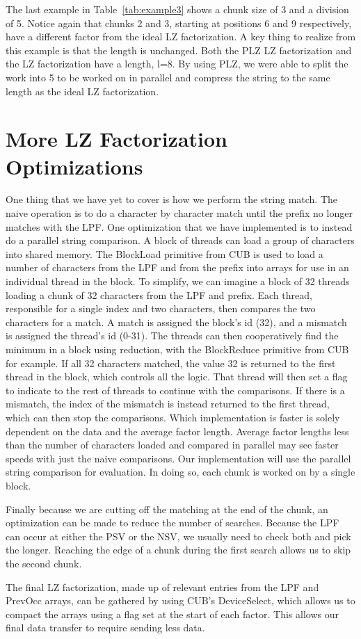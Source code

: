 The last example in Table~\ref{tab:example3} shows a chunk size of 3 and a division of 5.
Notice again that chunks 2 and 3, starting at positions 6 and 9 respectively, have a different factor from the ideal LZ factorization.
A key thing to realize from this example is that the length is unchanged.
Both the PLZ LZ factorization and the LZ factorization have a length, l=8.
By using PLZ, we were able to split the work into 5 to be worked on in parallel and compress the string to the same length as the ideal LZ factorization.

\section{More LZ Factorization Optimizations}

One thing that we have yet to cover is how we perform the string match.
The naive operation is to do a character by character match until the prefix no longer matches with the LPF.
One optimization that we have implemented is to instead do a parallel string comparison.
A block of threads can load a group of characters into shared memory.
The BlockLoad primitive from CUB is used to load a number of characters from the LPF and from the prefix into arrays for use in an individual thread in the block.
To simplify, we can imagine a block of 32 threads loading a chunk of 32 characters from the LPF and prefix.
Each thread, responsible for a single index and two characters, then compares the two characters for a match.
A match is assigned the block's id (32), and a mismatch is assigned the thread's id (0-31).
The threads can then cooperatively find the minimum in a block using reduction, with the BlockReduce primitive from CUB for example.
If all 32 characters matched, the value 32 is returned to the first thread in the block, which controls all the logic.
That thread will then set a flag to indicate to the rest of threads to continue with the comparisons.
If there is a mismatch, the index of the mismatch is instead returned to the first thread, which can then stop the comparisons.
Which implementation is faster is solely dependent on the data and the average factor length.
Average factor lengths less than the number of characters loaded and compared in parallel may see faster speeds with just the naive comparisons.
Our implementation will use the parallel string comparison for evaluation.
In doing so, each chunk is worked on by a single block.

Finally because we are cutting off the matching at the end of the chunk, an optimization can be made to reduce the number of searches.
Because the LPF can occur at either the PSV or the NSV, we usually need to check both and pick the longer. 
Reaching the edge of a chunk during the first search allows us to skip the second chunk.

The final LZ factorization, made up of relevant entries from the LPF and PrevOcc arrays, can be gathered by using CUB's DeviceSelect, which allows us to compact the arrays using a flag set at the start of each factor.
This allows our final data transfer to require sending less data.
